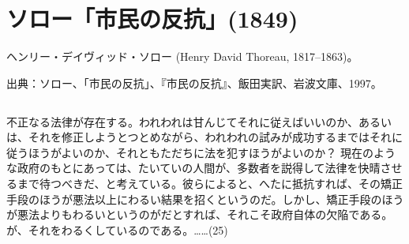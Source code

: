 





\pagebreak{}

\section{ソロー「市民の反抗」(1849)}


ヘンリー・デイヴィッド・ソロー (Henry David Thoreau, 1817--1863)。


出典：ソロー、「市民の反抗」、『市民の反抗』、飯田実訳、岩波文庫、1997。

\subsection{}

不正なる法律が存在する。われわれは甘んじてそれに従えばいいのか、あるいは、それを修正しようとつとめながら、われわれの試みが成功するまではそれに従うほうがよいのか、それともただちに法を犯すほうがよいのか？ 現在のような政府のもとにあっては、たいていの人間が、多数者を説得して法律を快晴させるまで待つべきだ、と考えている。彼らによると、へたに抵抗すれば、その矯正手段のほうが悪法以上にわるい結果を招くというのだ。しかし、矯正手段のほうが悪法よりもわるいというのがだとすれば、それこそ政府自体の欠陥である。が、それをわるくしているのである。……(25)


